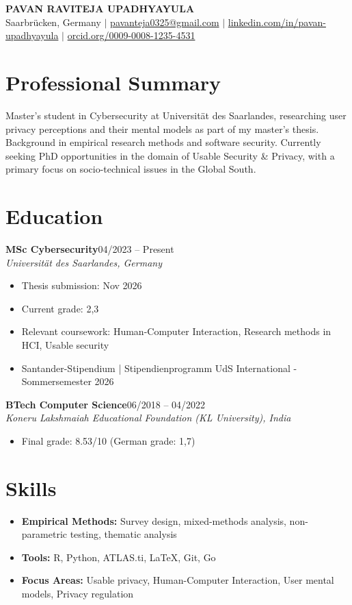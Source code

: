 \documentclass[10pt,a4paper]{article}
\newcommand{\entry}[3]{%
  \textbf{#1}\hfill{#2}\\\textit{#3}\vspace{2pt}}
\begin{document}
\begin{center}
{\LARGE\bfseries PAVAN RAVITEJA UPADHYAYULA}\\[4pt]
Saarbrücken, Germany $|$ \href{mailto:pavanteja0325@gmail.com}{pavanteja0325@gmail.com} $|$
\href{https://linkedin.com/in/pavan-upadhyayula}{linkedin.com/in/pavan-upadhyayula} $|$
\href{https://orcid.org/0009-0008-1235-4531}{orcid.org/0009-0008-1235-4531}
\end{center}

\section{Professional Summary}
Master's student in Cybersecurity at Universität des Saarlandes, researching user privacy perceptions and their mental models as part of my master's thesis. Background in empirical research methods and software security. Currently seeking PhD opportunities in the domain of Usable Security \& Privacy, with a primary focus on socio-technical issues in the Global South.

\section{Education}
\entry{MSc Cybersecurity}{04/2023 -- Present}{Universität des Saarlandes, Germany}
\begin{itemize}
\item Thesis submission: Nov 2026
\item Current grade: 2,3
\item Relevant coursework: Human-Computer Interaction, Research methods in HCI, Usable security
\item Santander-Stipendium | Stipendienprogramm UdS International - Sommersemester 2026
\end{itemize}
\vspace{4pt}
\entry{BTech Computer Science}{06/2018 -- 04/2022}{Koneru Lakshmaiah Educational Foundation (KL University), India}
\begin{itemize}
\item Final grade: 8.53/10 (German grade: 1,7)
\end{itemize}

\section{Skills}
\begin{itemize}
\item \textbf{Empirical Methods:} Survey design, mixed-methods analysis, non-parametric testing, thematic analysis
\item \textbf{Tools:} R, Python, ATLAS.ti, \LaTeX, Git, Go
\item \textbf{Focus Areas:} Usable privacy, Human-Computer Interaction, User mental models, Privacy regulation
\end{itemize}
\end{document}
